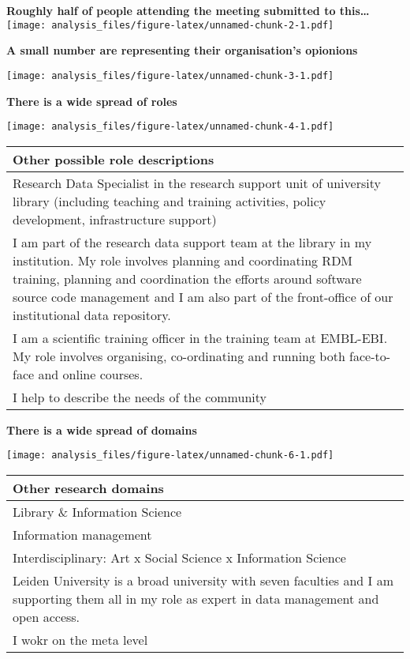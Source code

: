 \documentclass[]{article}
\title{}
\author{}
\date{}
\begin{document}
\textbf{Roughly half of people attending the meeting submitted to
this\ldots{}}
\texttt{[image: analysis\_files/figure-latex/unnamed-chunk-2-1.pdf]}

\textbf{A small number are representing their organisation's opionions}

\texttt{[image: analysis\_files/figure-latex/unnamed-chunk-3-1.pdf]}

\textbf{There is a wide spread of roles}

\texttt{[image: analysis\_files/figure-latex/unnamed-chunk-4-1.pdf]}

\begin{table}[H]
\centering
\begin{tabular}{>{\raggedright\arraybackslash\columncolor{khaki}}p{30em}}
\hline
Other possible role descriptions\\
\hline
Research Data Specialist in the research support unit of university library (including teaching and training activities, policy development, infrastructure support)\\
\hline
I am part of the research data support team at the library in my institution. My role involves planning and coordinating RDM training, planning and coordination the efforts around software source code management and I am also part of the front-office of our institutional data repository.\\
\hline
I am a scientific training officer in the training team at EMBL-EBI. My role involves organising, co-ordinating and running both face-to-face and online courses.\\
\hline
I help to describe the needs of the community\\
\hline
\end{tabular}
\end{table}

\textbf{There is a wide spread of domains}

\texttt{[image: analysis\_files/figure-latex/unnamed-chunk-6-1.pdf]}

\begin{table}[H]
\centering
\begin{tabular}{>{\raggedright\arraybackslash\columncolor{khaki}}p{30em}}
\hline
Other research domains\\
\hline
Library \& Information Science\\
\hline
Information management\\
\hline
Interdisciplinary: Art x Social Science x Information Science\\
\hline
Leiden University is a broad university with seven faculties and I am supporting them all in my role as expert in data management and open access.\\
\hline
I wokr on the meta level\\
\hline
\end{tabular}
\end{table}
\end{document}
